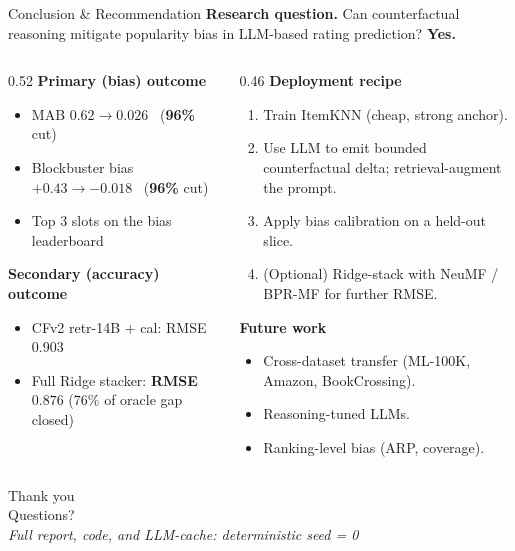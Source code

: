 \documentclass[aspectratio=169,10pt]{beamer}
\newcommand{\good}[1]{\textcolor{goodgreen}{\textbf{#1}}}
\begin{document}
\begin{frame}{Conclusion \& Recommendation}
  \textbf{Research question.}
  Can counterfactual reasoning mitigate popularity bias in LLM-based rating prediction? \textbf{\good{Yes.}}
  \vspace{0.5em}

  \begin{columns}[T,onlytextwidth]
    \begin{column}{0.52\textwidth}
      \textbf{Primary (bias) outcome}
      \begin{itemize}\itemsep0pt
        \item MAB $0.62 \to 0.026$ \ (\good{96\%} cut)
        \item Blockbuster bias $+0.43 \to -0.018$ \ (\good{96\%} cut)
        \item Top 3 slots on the bias leaderboard
      \end{itemize}
      \textbf{Secondary (accuracy) outcome}
      \begin{itemize}\itemsep0pt
        \item CFv2 retr-14B + cal: RMSE $0.903$
        \item Full Ridge stacker: \good{RMSE $0.876$} (76\% of oracle gap closed)
      \end{itemize}
    \end{column}
    \begin{column}{0.46\textwidth}
      \textbf{Deployment recipe}
      \begin{enumerate}\itemsep0pt
        \item Train ItemKNN (cheap, strong anchor).
        \item Use LLM to emit bounded counterfactual delta; retrieval-augment the prompt.
        \item Apply bias calibration on a held-out slice.
        \item (Optional) Ridge-stack with NeuMF / BPR-MF for further RMSE.
      \end{enumerate}
      \textbf{Future work}
      \begin{itemize}\itemsep0pt
        \item Cross-dataset transfer (ML-100K, Amazon, BookCrossing).
        \item Reasoning-tuned LLMs.
        \item Ranking-level bias (ARP, coverage).
      \end{itemize}
    \end{column}
  \end{columns}
\end{frame}

\begin{frame}[standout]
  Thank you \\[1em]
  \small Questions? \\[0.3em]
  \textit{Full report, code, and LLM-cache: deterministic seed = 0}
\end{frame}
\end{document}
